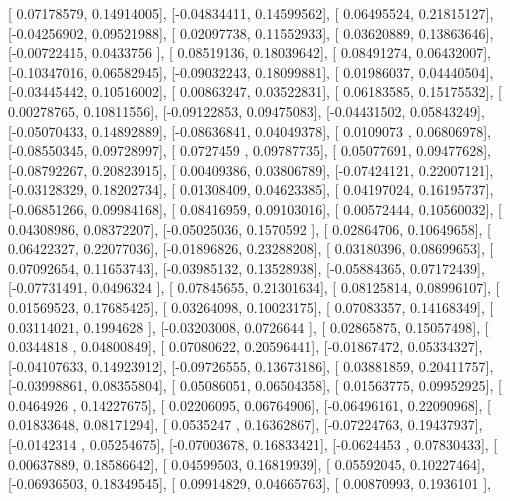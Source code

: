 \documentclass{article}
\begin{document}
       [ 0.07178579,  0.14914005],
       [-0.04834411,  0.14599562],
       [ 0.06495524,  0.21815127],
       [-0.04256902,  0.09521988],
       [ 0.02097738,  0.11552933],
       [ 0.03620889,  0.13863646],
       [-0.00722415,  0.0433756 ],
       [ 0.08519136,  0.18039642],
       [ 0.08491274,  0.06432007],
       [-0.10347016,  0.06582945],
       [-0.09032243,  0.18099881],
       [ 0.01986037,  0.04440504],
       [-0.03445442,  0.10516002],
       [ 0.00863247,  0.03522831],
       [ 0.06183585,  0.15175532],
       [ 0.00278765,  0.10811556],
       [-0.09122853,  0.09475083],
       [-0.04431502,  0.05843249],
       [-0.05070433,  0.14892889],
       [-0.08636841,  0.04049378],
       [ 0.0109073 ,  0.06806978],
       [-0.08550345,  0.09728997],
       [ 0.0727459 ,  0.09787735],
       [ 0.05077691,  0.09477628],
       [-0.08792267,  0.20823915],
       [ 0.00409386,  0.03806789],
       [-0.07424121,  0.22007121],
       [-0.03128329,  0.18202734],
       [ 0.01308409,  0.04623385],
       [ 0.04197024,  0.16195737],
       [-0.06851266,  0.09984168],
       [ 0.08416959,  0.09103016],
       [ 0.00572444,  0.10560032],
       [ 0.04308986,  0.08372207],
       [-0.05025036,  0.1570592 ],
       [ 0.02864706,  0.10649658],
       [ 0.06422327,  0.22077036],
       [-0.01896826,  0.23288208],
       [ 0.03180396,  0.08699653],
       [ 0.07092654,  0.11653743],
       [-0.03985132,  0.13528938],
       [-0.05884365,  0.07172439],
       [-0.07731491,  0.0496324 ],
       [ 0.07845655,  0.21301634],
       [ 0.08125814,  0.08996107],
       [ 0.01569523,  0.17685425],
       [ 0.03264098,  0.10023175],
       [ 0.07083357,  0.14168349],
       [ 0.03114021,  0.1994628 ],
       [-0.03203008,  0.0726644 ],
       [ 0.02865875,  0.15057498],
       [ 0.0344818 ,  0.04800849],
       [ 0.07080622,  0.20596441],
       [-0.01867472,  0.05334327],
       [-0.04107633,  0.14923912],
       [-0.09726555,  0.13673186],
       [ 0.03881859,  0.20411757],
       [-0.03998861,  0.08355804],
       [ 0.05086051,  0.06504358],
       [ 0.01563775,  0.09952925],
       [ 0.0464926 ,  0.14227675],
       [ 0.02206095,  0.06764906],
       [-0.06496161,  0.22090968],
       [ 0.01833648,  0.08171294],
       [ 0.0535247 ,  0.16362867],
       [-0.07224763,  0.19437937],
       [-0.0142314 ,  0.05254675],
       [-0.07003678,  0.16833421],
       [-0.0624453 ,  0.07830433],
       [ 0.00637889,  0.18586642],
       [ 0.04599503,  0.16819939],
       [ 0.05592045,  0.10227464],
       [-0.06936503,  0.18349545],
       [ 0.09914829,  0.04665763],
       [ 0.00870993,  0.1936101 ],
\end{document}
